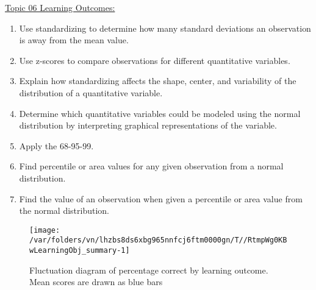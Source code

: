\documentclass[12pt,english,nohyper]{tufte-handout}\usepackage[]{graphicx}\usepackage[]{color}
\newenvironment{knitrout}{}{} %
\begin{document}
\noindent
\underline{Topic 06 Learning Outcomes:}
\vspace{2mm}

\begin{fullwidth}
\begin{enumerate}[label=\Alph*.,itemsep=-\parsep,leftmargin=*]
  \item
Use standardizing to determine how many standard deviations an observation is away from the mean value.
\item Use z-scores to compare observations for different quantitative variables.
\item Explain how standardizing affects the shape, center, and variability of the distribution of a quantitative variable.
\item Determine which quantitative variables could be modeled using the normal distribution by interpreting graphical representations of the variable.
\item Apply the 68-95-99.
\item Find percentile or area values for any given observation from a normal distribution.
\item Find the value of an observation when given a percentile or area value from the normal distribution.

\end{enumerate}
\end{fullwidth}

\begin{knitrout}
\color{fgcolor}\begin{figure}
\texttt{[image: /var/folders/vn/lhzbs8ds6xbg965nnfcj6ftm0000gn/T//RtmpWg0KBwLearningObj\_summary-1]} \caption[Fluctuation diagram of percentage correct by learning outcome]{Fluctuation diagram of percentage correct by learning outcome. Mean scores are drawn as blue bars}\label{fig:LearningObj_summary}
\end{figure}


\end{knitrout}

\vspace{5mm}
\end{document}
